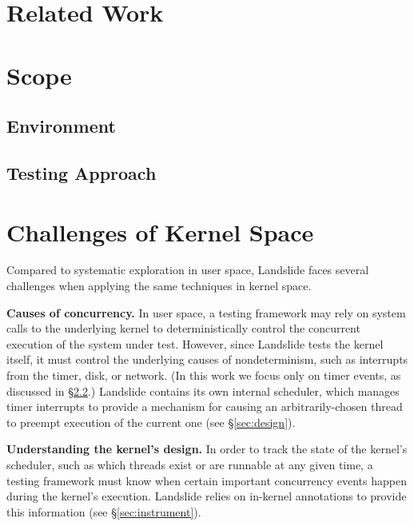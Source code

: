 \documentclass{llncs}
\begin{document}
\section{Related Work}

\section{Scope}
\subsection{Environment}
\subsection{Testing Approach}
\label{sec:approach}

\section{Challenges of Kernel Space}

Compared to systematic exploration in user space, Landslide faces several challenges when applying the same techniques in kernel space.

{\bf Causes of concurrency.} In user space, a testing framework may rely on system calls to the underlying kernel to deterministically control the concurrent execution of the system under test.
However, since Landslide tests the kernel itself, it must control the underlying causes of nondeterminism, such as interrupts from the timer, disk, or network. (In this work we focus only on timer events, as discussed in \S\ref{sec:approach}.)
Landslide contains its own internal scheduler, which manages timer interrupts to provide a mechanism for causing an arbitrarily-chosen thread to preempt execution of the current one (see \S\ref{sec:design}).

{\bf Understanding the kernel's design.} In order to track the state of the kernel's scheduler, such as which threads exist or are runnable at any given time, a testing framework must know when certain important concurrency events happen during the kernel's execution.
Landslide relies on in-kernel annotations to provide this information (see \S\ref{sec:instrument}).
\end{document}
